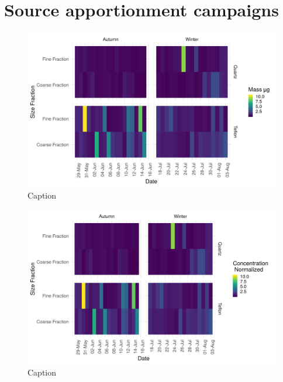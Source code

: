 \documentclass{nwureport}
\begin{document}

\chapter{Source apportionment campaigns}
\label{sec:source}


\begin{figure}[!htb]
    \centering
    \includegraphics[width=\textwidth]{images/Density_FilterDateSizeSeason_mass.png}
    \caption{Caption}
    \label{fig:summary}
\end{figure}

\begin{figure}[!htb]
    \centering
    \includegraphics[width=\textwidth]{images/Density_FilterDateSizeSeason.png}
    \caption{Caption}
    \label{fig:summary}
\end{figure}
\end{document}
